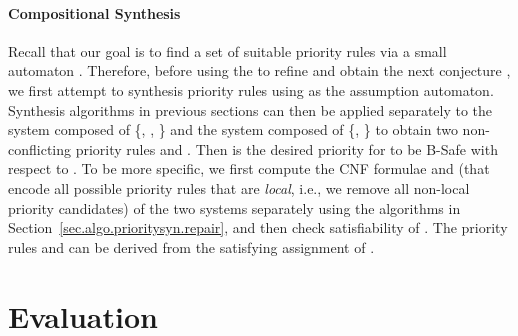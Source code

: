 \documentclass[10pt, a4paper, onecolumn, conference, compsocconf]{IEEEtran}
\begin{document}
\paragraph{Compositional Synthesis} Recall that our goal is to find a set of suitable priority rules via a small automaton . Therefore, before using the  to refine and obtain the next conjecture , we first attempt to synthesis priority rules using  as the assumption automaton.
Synthesis algorithms in previous sections can then be applied separately to the system composed of \{, , \} and the system composed of \{, \} to obtain two non-conflicting priority rules  and . Then  is the desired priority for  to be B-Safe with respect to .
To be more specific, we first compute the CNF formulae  and  (that encode all possible priority rules that are \emph{local}, i.e., we remove all non-local priority candidates) of the two systems separately using the algorithms in Section~\ref{sec.algo.prioritysyn.repair}, and then check satisfiability of .
The priority rules  and  can be derived from the satisfying assignment of .




\section{Evaluation\label{sec.algo.prioritysyn.evaluation}}
\end{document}
